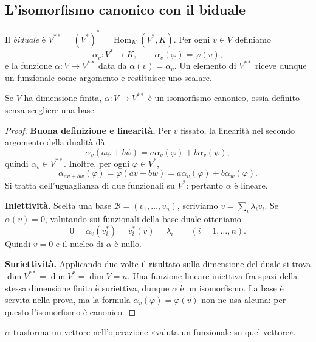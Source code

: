 \subsection{L'isomorfismo canonico con il biduale}
\begin{definizione}
Il \emph{biduale} è $V^{**}=(V^*)^*=\operatorname{Hom}_K(V^*,K)$. Per ogni $v\in V$ definiamo
\[
 \alpha_v:V^*\longrightarrow K,\qquad \alpha_v(\varphi)=\varphi(v),
\]
e la funzione $\alpha:V\to V^{**}$ data da $\alpha(v)=\alpha_v$. Un elemento di $V^{**}$ riceve dunque un funzionale come argomento e restituisce uno scalare.
\end{definizione}
\begin{teorema}
Se $V$ ha dimensione finita, $\alpha:V\to V^{**}$ è un isomorfismo canonico, ossia definito senza scegliere una base.
\end{teorema}
\begin{proof}
\textbf{Buona definizione e linearità.} Per $v$ fissato, la linearità nel secondo argomento della dualità dà
\[
 \alpha_v(a\varphi+b\psi)=a\alpha_v(\varphi)+b\alpha_v(\psi),
\]
quindi $\alpha_v\in V^{**}$. Inoltre, per ogni $\varphi\in V^*$,
\[
 \alpha_{av+bw}(\varphi)=\varphi(av+bw)
 =a\alpha_v(\varphi)+b\alpha_w(\varphi).
\]
Si tratta dell'uguaglianza di due funzionali su $V^*$: pertanto $\alpha$ è lineare.

\textbf{Iniettività.} Scelta una base $\mathcal B=(v_1,\ldots,v_n)$, scriviamo $v=\sum_i\lambda_iv_i$. Se $\alpha(v)=0$, valutando sui funzionali della base duale otteniamo
\[
 0=\alpha_v(v_i^*)=v_i^*(v)=\lambda_i\qquad(i=1,\ldots,n).
\]
Quindi $v=0$ e il nucleo di $\alpha$ è nullo.

\textbf{Suriettività.} Applicando due volte il risultato sulla dimensione del duale si trova $\dim V^{**}=\dim V^*=\dim V=n$. Una funzione lineare iniettiva fra spazi della stessa dimensione finita è suriettiva, dunque $\alpha$ è un isomorfismo. La base è servita nella prova, ma la formula $\alpha_v(\varphi)=\varphi(v)$ non ne usa alcuna: per questo l'isomorfismo è canonico.
\end{proof}
\begin{schema}

$\alpha$ trasforma un vettore nell'operazione «valuta un funzionale su quel vettore».
\end{schema}

